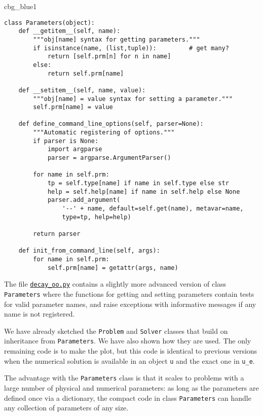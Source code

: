 \documentclass[graybox,sectrefs,envcountresetchap,open=right,final]{svmonodo}
\newenvironment{_cod_tight}[1]{
   \def\FrameCommand{\colorbox{#1}}
   \FrameRule0.6pt\MakeFramed {\FrameRestore}\vskip3mm}
   {\vskip0mm\endMakeFramed}
\newenvironment{cod}[1]{
\bgroup\rmfamily
\fboxsep=0mm\relax
\begin{_cod_tight}{#1}
\list{}{\parsep=-2mm\parskip=0mm\topsep=0pt\leftmargin=2mm
\rightmargin=2\leftmargin\leftmargin=4pt\relax}
\item\relax}
{\endlist\end{_cod_tight}\egroup}
\begin{document}
\begin{cod}{cbg_blue1}\begin{Verbatim}[numbers=none,fontsize=\fontsize{9pt}{9pt},baselinestretch=0.95,xleftmargin=2mm]
class Parameters(object):
    def __getitem__(self, name):
        """obj[name] syntax for getting parameters."""
        if isinstance(name, (list,tuple)):         # get many?
            return [self.prm[n] for n in name]
        else:
            return self.prm[name]

    def __setitem__(self, name, value):
        """obj[name] = value syntax for setting a parameter."""
        self.prm[name] = value

    def define_command_line_options(self, parser=None):
        """Automatic registering of options."""
        if parser is None:
            import argparse
            parser = argparse.ArgumentParser()

        for name in self.prm:
            tp = self.type[name] if name in self.type else str
            help = self.help[name] if name in self.help else None
            parser.add_argument(
                '--' + name, default=self.get(name), metavar=name,
                type=tp, help=help)

        return parser

    def init_from_command_line(self, args):
        for name in self.prm:
            self.prm[name] = getattr(args, name)
\end{Verbatim}
\end{cod}
\noindent
The file \href{{http://tinyurl.com/ofkw6kc/softeng/decay_oo.py}}{\nolinkurl{decay_oo.py}} contains
a slightly more advanced version of class \texttt{Parameters} where
the functions for getting and setting parameters
contain tests for valid parameter names, and
raise exceptions with informative messages if any name is not registered.

We have already sketched the \texttt{Problem} and \texttt{Solver} classes that build
on inheritance from \texttt{Parameters}. We have also shown how they are
used. The only remaining code is to make the plot, but this code is
identical to previous versions when the numerical solution is
available in an object \texttt{u} and the exact one in \Verb!u_e!.

The advantage with the \texttt{Parameters} class is that it scales to problems
with a large number of physical and numerical parameters:
as long as the parameters are defined once via a dictionary,
the compact code in class \texttt{Parameters} can handle any collection of
parameters of any size.
\end{document}
